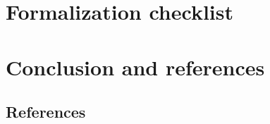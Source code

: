 \documentclass[11pt]{article}
\theoremstyle{definition}
\theoremstyle{plain}
\theoremstyle{remark}
\begin{document}
\section{Formalization checklist}

\section{Conclusion and references}

\subsection*{References}
\end{document}
